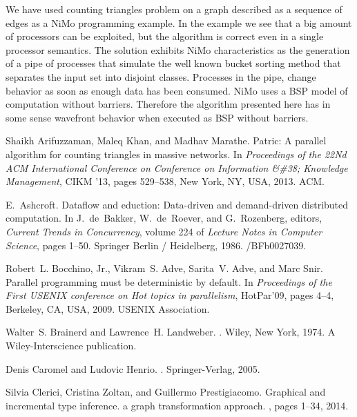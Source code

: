 \documentclass{article}                     \usepackage{graphics}
\begin{document}
		We have used counting triangles  problem on a graph described as a sequence of edges as a NiMo programming example.   In the example we  see that a big amount of processors can be exploited, but the algorithm is correct even in a single processor semantics. The solution exhibits NiMo characteristics as the generation of a pipe of processes that simulate the well known bucket sorting method that separates the input set into disjoint classes. 	Processes in the pipe, change behavior as soon as enough data has been consumed. NiMo uses a BSP model of computation without barriers.  Therefore the algorithm presented here has in some sense  wavefront behavior when executed as BSP without barriers. 	
\begin{thebibliography}{10}

Shaikh Arifuzzaman, Maleq Khan, and Madhav Marathe.
\newblock Patric: A parallel algorithm for counting triangles in massive
  networks.
\newblock In {\em Proceedings of the 22Nd ACM International Conference on
  Conference on Information \&\#38; Knowledge Management}, CIKM '13, pages
  529--538, New York, NY, USA, 2013. ACM.

E.~Ashcroft.
\newblock Dataflow and eduction: Data-driven and demand-driven distributed
  computation.
\newblock In J.~de~Bakker, W.~de~Roever, and G.~Rozenberg, editors, {\em
  Current Trends in Concurrency}, volume 224 of {\em Lecture Notes in Computer
  Science}, pages 1--50. Springer Berlin / Heidelberg, 1986.
/BFb0027039.

Robert~L. Bocchino, Jr., Vikram~S. Adve, Sarita~V. Adve, and Marc Snir.
\newblock Parallel programming must be deterministic by default.
\newblock In {\em Proceedings of the First USENIX conference on Hot topics in
  parallelism}, HotPar'09, pages 4--4, Berkeley, CA, USA, 2009. USENIX
  Association.

Walter~S. Brainerd and Lawrence~H. Landweber.
.
\newblock Wiley, New York, 1974.
\newblock A Wiley-Interscience publication.

Denis Caromel and Ludovic Henrio.
.
\newblock Springer-Verlag, 2005.

Silvia Clerici, Cristina Zoltan, and Guillermo Prestigiacomo.
\newblock Graphical and incremental type inference. a graph transformation
  approach.
, pages 1--34, 2014.


\end{thebibliography}
\end{document}
